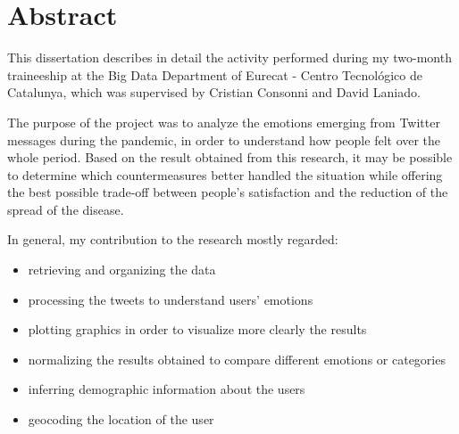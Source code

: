 
\chapter*{Abstract} %
\label{abstract}  


This dissertation describes in detail the activity performed during my two-month traineeship at the Big Data Department of Eurecat - Centro Tecnológico de Catalunya, which was supervised by Cristian Consonni and David Laniado.

The purpose of the project was to analyze the emotions emerging from Twitter messages during the pandemic, in order to understand how people felt over the whole period. Based on the result obtained from this research, it may be possible to determine which countermeasures better handled the situation while offering the best possible trade-off between people's satisfaction and the reduction of the spread of the disease.

In general, my contribution to the research mostly regarded:

\begin{itemize}
	\item retrieving and organizing the data
	\item processing the tweets to understand users' emotions
	\item plotting graphics in order to visualize more clearly the results
	\item normalizing the results obtained to compare different emotions or categories
	\item inferring demographic information about the users
	\item geocoding the location of the user
\end{itemize}

